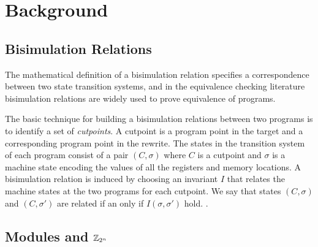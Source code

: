 \section{Background}


\subsection{Bisimulation Relations}

The mathematical definition of a bisimulation relation specifies
a correspondence between two state transition systems, and in the
equivalence checking literature bisimulation relations are widely
used to prove equivalence of programs. 

The basic technique for building a bisimulation relations between two
programs is to identify a set of \emph{cutpoints}. A cutpoint is a
program point in the target and a corresponding program point in the
rewrite. The states in the transition system of each program consist
of a pair $(C, \sigma)$ where $C$ is a cutpoint and $\sigma$ is a
machine state encoding the values of all the registers and memory
locations. A bisimulation relation is induced by choosing an invariant
$I$ that relates the machine states at the two programs for each
cutpoint. We say that states $(C, \sigma)$ and $(C, \sigma')$ are
related if an only if $I(\sigma, \sigma')$ hold. . 


\subsection{Modules and $\mathbb{Z}_{2^{n}}$}

